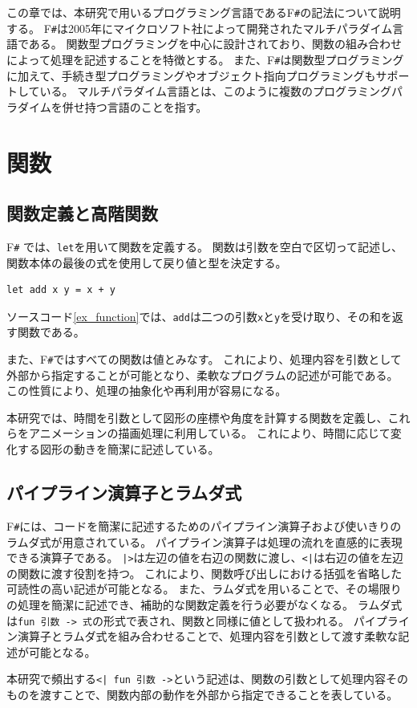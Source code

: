 この章では、本研究で用いるプログラミング言語であるF\texttt{\#}\cite{arai2011fsharp,fsharpBeginner}の記法について説明する。
F\texttt{\#}は2005年にマイクロソフト社によって開発されたマルチパラダイム言語である。
関数型プログラミングを中心に設計されており、関数の組み合わせによって処理を記述することを特徴とする。
また、F\texttt{\#}は関数型プログラミングに加えて、手続き型プログラミングやオブジェクト指向プログラミングもサポートしている。
マルチパラダイム言語とは、このように複数のプログラミングパラダイムを併せ持つ言語のことを指す。

\section{関数}
\subsection{関数定義と高階関数}
F\texttt{\#} では、\texttt{let}を用いて関数を定義する。
関数は引数を空白で区切って記述し、関数本体の最後の式を使用して戻り値と型を決定する。
 \begin{lstlisting}[caption={F\texttt{\#}における関数定義の例},label={ex_function},breaklines=true,breakatwhitespace=false]
let add x y = x + y
\end{lstlisting}
ソースコード\ref{ex_function}では、\texttt{add}は二つの引数\texttt{x}と\texttt{y}を受け取り、その和を返す関数である。
\par
また、F\texttt{\#}ではすべての関数は値とみなす。
これにより、処理内容を引数として外部から指定することが可能となり、柔軟なプログラムの記述が可能である。
この性質により、処理の抽象化や再利用が容易になる。
\par
本研究では、時間を引数として図形の座標や角度を計算する関数を定義し、これらをアニメーションの描画処理に利用している。
これにより、時間に応じて変化する図形の動きを簡潔に記述している。

\subsection{パイプライン演算子とラムダ式}
F\texttt{\#}には、コードを簡潔に記述するためのパイプライン演算子および使いきりのラムダ式が用意されている。
パイプライン演算子は処理の流れを直感的に表現できる演算子である。
\texttt{|>}は左辺の値を右辺の関数に渡し、\texttt{<|}は右辺の値を左辺の関数に渡す役割を持つ。
これにより、関数呼び出しにおける括弧を省略した可読性の高い記述が可能となる。
また、ラムダ式を用いることで、その場限りの処理を簡潔に記述でき、補助的な関数定義を行う必要がなくなる。
ラムダ式は\texttt{fun 引数 -> 式}の形式で表され、関数と同様に値として扱われる。
パイプライン演算子とラムダ式を組み合わせることで、処理内容を引数として渡す柔軟な記述が可能となる。
\par
本研究で頻出する\texttt{<| fun 引数 ->}という記述は、関数の引数として処理内容そのものを渡すことで、関数内部の動作を外部から指定できることを表している。

